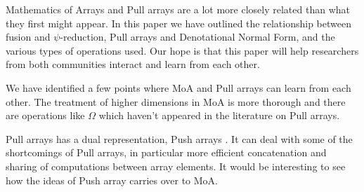 \documentclass{sigplanconf}
\begin{document}
Mathematics of Arrays and Pull arrays are a lot more closely related
than what they first might appear. In this paper we have outlined the
relationship between fusion and \(\psi\)-reduction, Pull arrays and
Denotational Normal Form, and the various types of operations used.
Our hope is that this paper will help researchers from both
communities interact and learn from each other.

We have identified a few points where MoA and Pull arrays can learn
from each other. The treatment of higher dimensions in MoA is more
thorough and there are operations like $\Omega$ which haven't appeared
in the literature on Pull arrays.

Pull arrays has a dual representation, Push arrays
\cite{Claessen:2012:Expressive}. It can deal with some of the
shortcomings of Pull arrays, in particular more efficient
concatenation and sharing of computations between array elements. It
would be interesting to see how the ideas of Push array carries over
to MoA.










\end{document}
